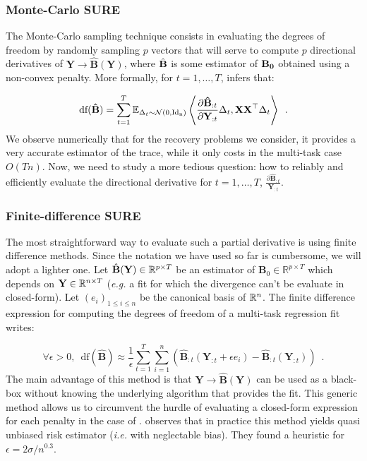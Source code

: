 \documentclass[a4paper,10pt]{article}
\theoremstyle{definition}
\begin{document}
\subsubsection*{Monte-Carlo SURE}

The Monte-Carlo sampling technique consists in evaluating the degrees of freedom by randomly sampling $p$ vectors that will serve to compute $p$ directional derivatives
of $\mathbf{Y} \rightarrow \mathbf{\hat{B}(Y)}$, where $\hat{\bf B}$ is some estimator of $\bf B_0$ obtained using a non-convex penalty.
%
More formally, for $t = 1, \dots, T$, \cite{Ramani_Blu_Unser08} infers that:

\begin{equation*}
    \text{df}(\mathbf{\hat{B}}) =
    \sum_{t=1}^T \mathbb{E}_{\Delta_t \sim \mathcal{N}(0, \text{Id}_\text{n})}
    \left \langle
            \frac{\partial \mathbf{\hat{B}}_{:t} }{
            \partial \mathbf{Y}_{:t}} \Delta_t, \mathbf{X X}^{\top} \Delta_t
    \right \rangle
    \enspace .
\end{equation*}
%
We observe numerically that for the recovery problems we consider, it provides a very accurate estimator of the trace, while
it only costs in the multi-task case $O(Tn)$. Now, we need to study a more tedious question: how to reliably and efficiently
evaluate the directional derivative for $t=1, \dots, T$, $\frac{\partial \mathbf{\hat{B}}_{:t} }{\mathbf{Y}_{:t}}$.

\subsubsection*{Finite-difference SURE}

The most straightforward way to evaluate such a partial derivative is using finite difference methods.
Since the notation we have used so far is cumbersome, we will adopt a lighter one. Let $\hat{\mathbf{B}}(\mathbf{Y}) \in \mathbb{R}^{p\times T}$ be an estimator
of $\mathbf{B}_0 \in \mathbb{R}^{p\times T}$ which depends on $\mathbf{Y} \in \mathbb{R}^{n \times T}$ (\textit{e.g.} a  fit for which the divergence
can't be evaluate in closed-form). Let $(e_i)_{1 \leq i \leq n}$ be the canonical basis of $\mathbb{R}^n$. The finite difference expression for computing
the degrees of freedom of a multi-task regression fit writes:

\begin{equation*}
    \forall \epsilon > 0, \enspace \text{df}(\mathbf{\hat{B}}) \approx
    \frac{1}{\epsilon} \sum_{t=1}^T \sum_{i=1}^n
        \left(
            \mathbf{\hat{B}}_{:t}(\mathbf{Y}_{:t} + \epsilon e_i)
            - \mathbf{\hat{B}}_{:t}(\mathbf{Y}_{:t})
        \right)
    \enspace .
\end{equation*}
%
The main advantage of this method is that $\mathbf{Y} \rightarrow \mathbf{\hat{B}(Y)}$ can be used as a black-box without knowing the underlying algorithm that provides
the fit. This generic method allows us to circumvent the hurdle of evaluating a closed-form expression for each penalty in the case of .
\cite{Deledalle_Vaiter_Fadili_Peyre14} observes that in practice this method yields quasi unbiased risk estimator (\textit{i.e.} with neglectable bias). They
found a heuristic for $\epsilon = 2 \sigma / n^{0.3}$.
\end{document}
